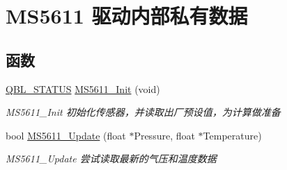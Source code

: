 \hypertarget{group__ms5611__driver__internal}{}\section{M\+S5611 驱动内部私有数据}
\label{group__ms5611__driver__internal}
\subsection*{函数}
\begin{DoxyCompactItemize}
\item 
\hyperlink{group__qbl_ga41526b685f55486191108499fe91c30b}{Q\+B\+L\+\_\+\+S\+T\+A\+T\+US} \hyperlink{group__ms5611__driver__internal_gad95cb9e2dfcda543ebc7ea207c652517}{M\+S5611\+\_\+\+Init} (void)
\begin{DoxyCompactList}\small\item\em M\+S5611\+\_\+\+Init 初始化传感器，并读取出厂预设值，为计算做准备 \end{DoxyCompactList}\item 
bool \hyperlink{group__ms5611__driver__internal_ga776a0112261b15cd6d234c77152b384a}{M\+S5611\+\_\+\+Update} (float $\ast$Pressure, float $\ast$Temperature)
\begin{DoxyCompactList}\small\item\em M\+S5611\+\_\+\+Update 尝试读取最新的气压和温度数据 \end{DoxyCompactList}\end{DoxyCompactItemize}
